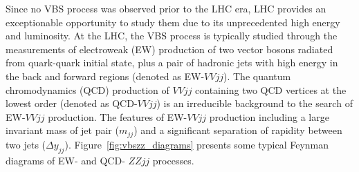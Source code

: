 Since no VBS process was observed prior to the LHC era, LHC provides an exceptionable opportunity to study them due to its unprecedented high energy and luminosity.
At the LHC, the VBS process is typically studied through the measurements of electroweak (EW) production of two vector bosons radiated from quark-quark initial state, 
plus a pair of hadronic jets with high energy in the back and forward regions (denoted as EW-$VVjj$).
The quantum chromodynamics (QCD) production of $VVjj$ containing two QCD vertices at the lowest order (denoted as QCD-$VVjj$) is an irreducible background to the search of EW-$VVjj$ production.
The features of EW-$VVjj$ production including a large invariant mass of jet pair ($m_{jj}$) and a significant separation of rapidity between two jets ($\Delta y_{jj}$).
Figure~\ref{fig:vbszz_diagrams} presents some typical Feynman diagrams of EW- and QCD- $ZZjj$ processes.
